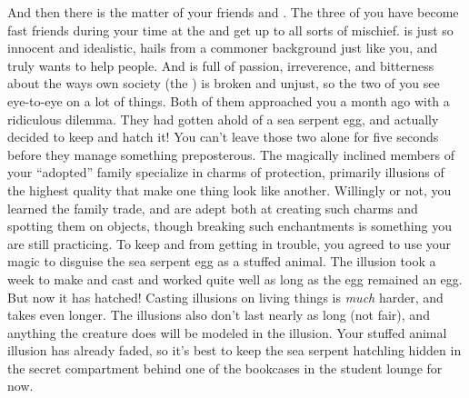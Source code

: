 \documentclass[char]{GL2020}
\begin{document}
And then there is the matter of your friends \cDisney{\full} and \cPirateChild{\full}. The three of you have become fast friends during your time at the \pSchool{} and get up to all sorts of mischief. \cDisney{} is just so innocent and idealistic, hails from a commoner background just like you, and truly wants to help people. And \cPirateChild{} is full of passion, irreverence, and bitterness about the ways \cPirateChild{\their} own society (the \pShip{}) is broken and unjust, so the two of you see eye-to-eye on a lot of things. Both of them approached you a month ago with a ridiculous dilemma. They had gotten ahold of a sea serpent egg, and actually decided to keep and hatch it! You can't leave those two alone for five seconds before they manage something preposterous. The magically inclined members of your ``adopted'' family specialize in charms of protection, primarily illusions of the highest quality that make one thing look like another. Willingly or not, you learned the family trade, and are adept both at creating such charms and spotting them on objects, though breaking such enchantments is something you are still practicing. To keep \cDisney{} and \cPirateChild{} from getting in trouble, you agreed to use your magic to disguise the sea serpent egg as a stuffed animal. The illusion took a week to make and cast and worked quite well as long as the egg remained an egg. But now it has hatched! Casting illusions on living things is \emph{much} harder, and takes even longer. The illusions also don't last nearly as long (not fair), and anything the creature does will be modeled in the illusion. Your stuffed animal illusion has already faded, so it's best to keep the sea serpent hatchling hidden in the secret compartment behind one of the bookcases in the student lounge for now.
\end{document}
